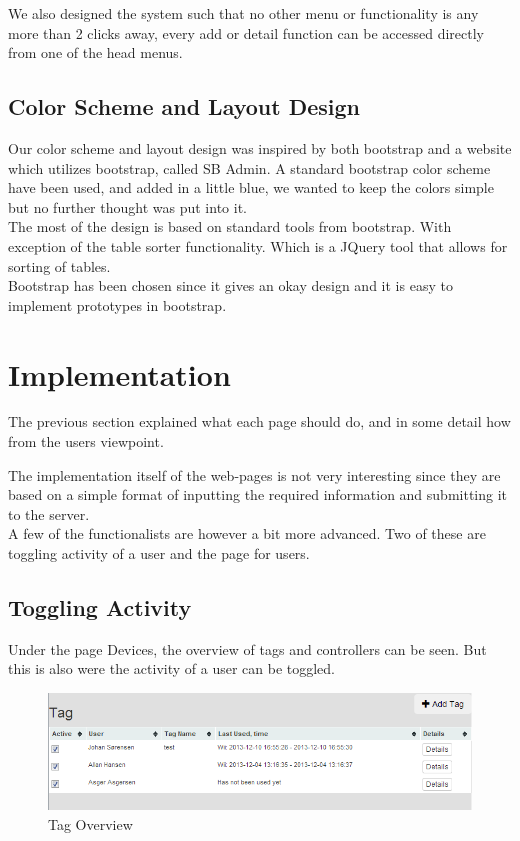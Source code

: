 We also designed the system such that no other menu or functionality is any more than 2 clicks away, every add or detail function can be accessed directly from one of the head menus.\\

\subsection{Color Scheme and Layout Design}
Our color scheme and layout design was inspired by both bootstrap and a website which utilizes bootstrap, called SB Admin\citep{sbadmin}. A standard bootstrap color scheme have been used, and added in a little blue, we wanted to keep the colors simple but no further thought was put into it.\\
The most of the design is based on standard tools from bootstrap. With exception of the table sorter functionality. Which is a JQuery tool that allows for sorting of tables.\\
Bootstrap has been chosen since it gives an okay design and it is easy to implement prototypes in bootstrap.	


\section{Implementation}
The previous section explained what each page should do, and in some detail how from the users viewpoint.

The implementation itself of the web-pages is not very interesting since they are based on a simple format of inputting the required information and submitting it to the server.\\
A few of the functionalists are however a bit more advanced. Two of these are toggling activity of a user and the page for users.\\

\subsection{Toggling Activity}

Under the page Devices, the overview of tags and controllers can be seen. But this is also were the activity of a user can be toggled.

\begin{figure}[htbp]
	\centering
		\includegraphics[width=1.00\textwidth]{images/tagOverview.PNG}
	\caption{Tag Overview}
	\label{fig:tagOverview}
\end{figure}

